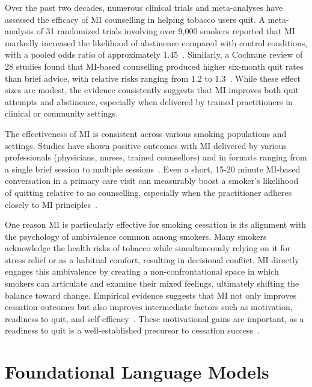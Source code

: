 Over the past two decades, numerous clinical trials and meta-analyses have assessed the efficacy of MI counselling in helping tobacco users quit. A meta-analysis of 31 randomized trials involving over 9,000 smokers reported that MI markedly increased the likelihood of abstinence compared with control conditions, with a pooled odds ratio of approximately 1.45~\cite{Heckman2010}. Similarly, a Cochrane review of 28 studies found that MI-based counselling produced higher six-month quit rates than brief advice, with relative risks ranging from 1.2 to 1.3~\cite{Lindson2015}. While these effect sizes are modest, the evidence consistently suggests that MI improves both quit attempts and abstinence, especially when delivered by trained practitioners in clinical or community settings.

The effectiveness of MI is consistent across various smoking populations and settings. Studies have shown positive outcomes with MI delivered by various professionals (physicians, nurses, trained counsellors) and in formats ranging from a single brief session to multiple sessions~\cite{Lindson2015}. Even a short, 15-20 minute MI-based conversation in a primary care visit can measurably boost a smoker's likelihood of quitting relative to no counselling, especially when the practitioner adheres closely to MI principles~\cite{zanjani2008effectiveness}.


One reason MI is particularly effective for smoking cessation is its alignment with the psychology of ambivalence common among smokers. Many smokers acknowledge the health risks of tobacco while simultaneously relying on it for stress relief or as a habitual comfort, resulting in decisional conflict. MI directly engages this ambivalence by creating a non-confrontational space in which smokers can articulate and examine their mixed feelings, ultimately shifting the balance toward change. Empirical evidence suggests that MI not only improves cessation outcomes but also improves intermediate factors such as motivation, readiness to quit, and self-efficacy~\cite{Boudreaux2012, Hettema2005}. These motivational gains are important, as a readiness to quit is a well-established precursor to cessation success~\cite{West2006}.




\section{Foundational Language Models} \label{sec:foundational_models}


